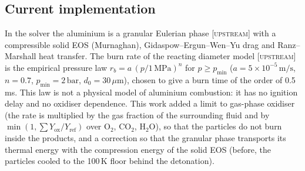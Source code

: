 \documentclass{article}
\newcommand{\up}{\textsc{[upstream]}}
\begin{document}
\subsection{Current implementation}
\label{sec:al_impl}

In the solver the aluminium is a granular Eulerian phase \up{} with a compressible solid EOS (Murnaghan), Gidaspow--Ergun--Wen--Yu drag and Ranz--Marshall heat transfer. The burn rate of the reacting diameter model \up{} is the empirical pressure law $r_b = a\,(p/1\,\text{MPa})^n$ for $p \ge p_\text{min}$ ($a = 5\times10^{-5}\,\text{m/s}$, $n = 0.7$, $p_\text{min} = 2\,\text{bar}$, $d_0 = 30\,\mu\text{m}$), chosen to give a burn time of the order of 0.5\,ms. This law is not a physical model of aluminium combustion: it has no ignition delay and no oxidiser dependence. This work added a limit to gas-phase oxidiser (the rate is multiplied by the gas fraction of the surrounding fluid and by $\min(1, \sum Y_\text{ox}/Y_\text{ref})$ over O$_2$, CO$_2$, H$_2$O), so that the particles do not burn inside the products, and a correction so that the granular phase transports its thermal energy with the compression energy of the solid EOS (before, the particles cooled to the 100\,K floor behind the detonation).
\end{document}
